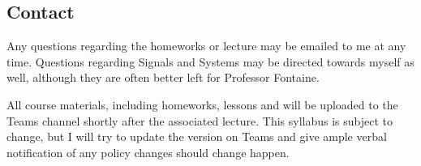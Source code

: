 \documentclass{article}
\begin{document}
\clearpage
\subsection*{Contact}
Any questions regarding the homeworks or lecture may be emailed to me at any time. Questions regarding Signals and Systems may be directed towards myself as well, although they are often better left for Professor Fontaine.

All course materials, including homeworks, lessons and will be uploaded to the Teams channel shortly after the associated lecture. This syllabus is subject to change, but I will try to update the version on Teams and give ample verbal notification of any policy changes should change happen.
\end{document}
